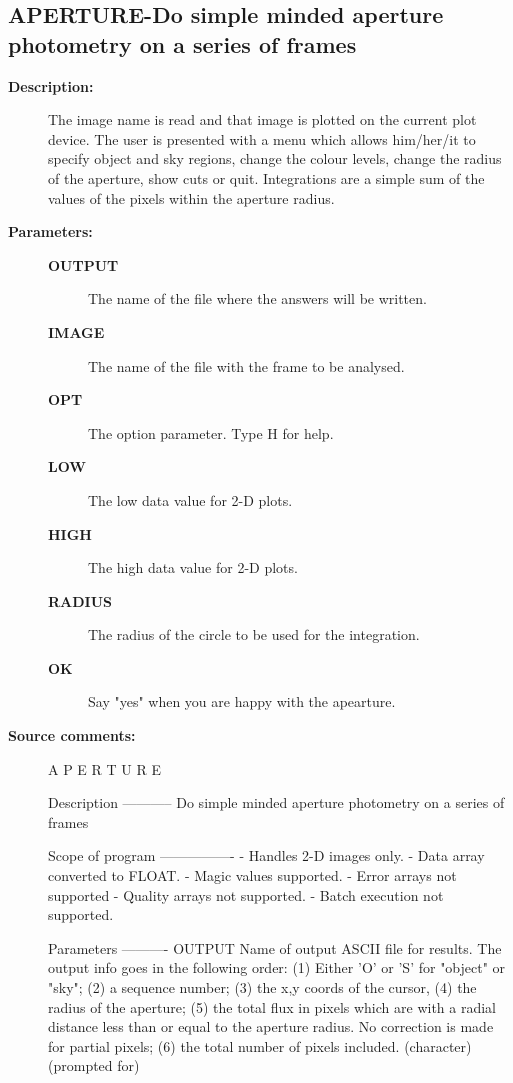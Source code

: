 \subsection{APERTURE-\label{APERTURE}Do simple minded aperture photometry on a series of frames}
\begin{description}

\item [\textbf{Description:}]
 The image name is read and that image is plotted on the current
 plot device.  The user is presented with a menu which allows
 him/her/it to specify object and sky regions, change the colour
 levels, change the radius of the aperture, show cuts or quit.
 Integrations are a simple sum of the values of the pixels within
 the aperture radius.

\item [\textbf{Parameters:}]
\begin{description}
\item [\textbf{OUTPUT}]
 The name of the file where the answers will be written.
\item [\textbf{IMAGE}]
 The name of the file with the frame to be analysed.
\item [\textbf{OPT}]
 The option parameter.  Type H for help.
\item [\textbf{LOW}]
 The low data value for 2-D plots.
\item [\textbf{HIGH}]
 The high data value for 2-D plots.
\item [\textbf{RADIUS}]
 The radius of the circle to be used for the integration.
\item [\textbf{OK}]
 Say "yes" when you are happy with the apearture.
\end{description}

\item [\textbf{Source comments:}]
\begin{terminalv}
 A P E R T U R E

 Description
 -----------
 Do simple minded aperture photometry on a series of frames

 Scope of program
 ----------------
 - Handles 2-D images only.
 - Data array converted to FLOAT.
 - Magic values supported.
 - Error arrays not supported
 - Quality arrays not supported.
 - Batch execution not supported.

 Parameters
 ----------
 OUTPUT    Name of output ASCII file for results. The output info goes in
           the following order: (1) Either 'O' or 'S' for "object" or
           "sky"; (2) a sequence number; (3) the x,y coords of the
           cursor, (4) the radius of the aperture; (5) the total
           flux in pixels which are with a radial distance less than
           or equal to the aperture radius.  No correction is made for
           partial pixels; (6) the total number of pixels included.
           (character)(prompted for)


\end{terminalv}
\end{description}
